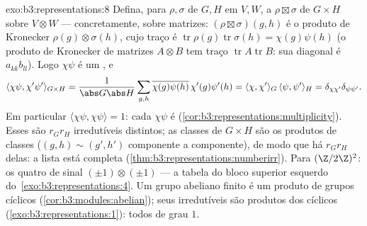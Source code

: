 \begin{solution}{exo:b3:representations:8}
Defina, para  $\rho, \sigma$ de $G, H$ em $V, W$,
a  $\rho \boxtimes \sigma$ de $G \times H$ sobre
$V \otimes W$ --- concretamente, sobre matrizes: $(\rho\boxtimes
\sigma)(g,h)$ é o produto de Kronecker $\rho(g)\otimes
\sigma(h)$, cujo traço é
$\operatorname{tr}\rho(g)\operatorname{tr}\sigma(h) =
\chi(g)\psi(h)$ (o produto de Kronecker de matrizes $A \otimes B$
tem traço $\operatorname{tr}A\operatorname{tr}B$: sua diagonal
é $a_{kk}b_{ll}$). Logo $\chi\psi$ é um , e
\[
\langle\chi\psi, \chi'\psi'\rangle_{G\times H}
= \frac{1}{\abs G\abs H}\sum_{g,h}
\overline{\chi(g)\psi(h)}\,\chi'(g)\psi'(h)
= \langle\chi,\chi'\rangle_G\,\langle\psi,\psi'\rangle_H
= \delta_{\chi\chi'}\delta_{\psi\psi'}.
\]
Em particular $\langle\chi\psi,\chi\psi\rangle = 1$: cada
$\chi\psi$ é 
(\cref{cor:b3:representations:multiplicity}). Esses são
$r_Gr_H$  irredutíveis distintos; as classes de
$G\times H$ são os produtos de classes ($(g,h) \sim (g',h')$
componente a componente), de modo que há $r_Gr_H$ delas: a lista está
completa (\cref{thm:b3:representations:numberirr}). Para
$(\Z/2\Z)^2$: os quatro  de sinal
$(\pm1)\otimes(\pm1)$ --- a tabela do bloco superior esquerdo
do~\cref{exo:b3:representations:4}. Um grupo abeliano finito é
um produto de grupos cíclicos
(\cref{cor:b3:modules:abelian}); seus  irredutíveis são
produtos dos cíclicos (\cref{exo:b3:representations:1}):
todos de grau $1$.
\end{solution}

